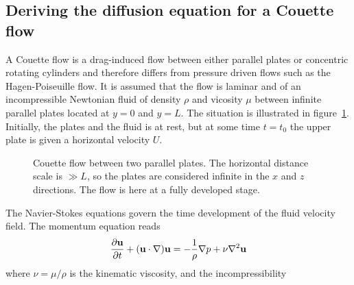 \documentclass[aps,reprint]{revtex4-1}
\def\axislength{.5}
\begin{document}
\subsection{Deriving the diffusion equation for a Couette flow}
A Couette flow is a drag-induced flow between either parallel plates or concentric
rotating cylinders and therefore differs from pressure driven flows such as the
Hagen-Poiseuille flow. It is assumed that the flow is laminar and of an incompressible
Newtonian fluid of density $\rho$ and vicosity $\mu$ between infinite parallel
plates located at $y = 0$ and $y = L$. The situation is illustrated in figure~\ref{fig:couette}.
Initially, the plates and the fluid is at rest, but at some time $t = t_0$
the upper plate is given a horizontal velocity $U$.
\begin{figure}[H]
  \centering
  \caption{Couette flow between two parallel plates. The horizontal distance
  scale is $\gg L$, so the plates are considered infinite in the $x$ and $z$
  directions. The flow is here at a fully developed stage.}
  \label{fig:couette}
\end{figure}
The Navier-Stokes equations govern the time development of the fluid velocity field.
The momentum equation reads
\begin{align*}
  \pdv{\vb{u}}{t} + (\vb{u} \cdot \nabla) \vb{u} = - \frac{1}{\rho} \nabla p + \nu \nabla^2 \vb{u}
\end{align*}
where $\nu = \mu/\rho$ is the kinematic viscosity, and the incompressibility
\end{document}
